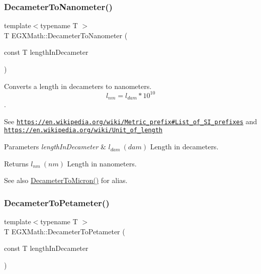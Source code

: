 \subsubsection{\texorpdfstring{Decameter\+To\+Nanometer()}{DecameterToNanometer()}}
{\footnotesize\ttfamily template$<$typename T $>$ \\
T E\+G\+X\+Math\+::\+Decameter\+To\+Nanometer (\begin{DoxyParamCaption}\item[{const T}]{length\+In\+Decameter }\end{DoxyParamCaption})}



Converts a length in decameters to nanometers. \[ l_{nm}=l_{dam} * 10^{10} \]. 

See \href{https://en.wikipedia.org/wiki/Metric_prefix#List_of_SI_prefixes}{\tt https\+://en.\+wikipedia.\+org/wiki/\+Metric\+\_\+prefix\#\+List\+\_\+of\+\_\+\+S\+I\+\_\+prefixes} and \href{https://en.wikipedia.org/wiki/Unit_of_length}{\tt https\+://en.\+wikipedia.\+org/wiki/\+Unit\+\_\+of\+\_\+length} 
\begin{DoxyParams}{Parameters}
{\em length\+In\+Decameter} & $ l_{dam}\ (dam)$ Length in decameters. \\
\hline
\end{DoxyParams}
\begin{DoxyReturn}{Returns}
$ l_{nm}\ (nm)$ Length in nanometers. 
\end{DoxyReturn}
\begin{DoxySeeAlso}{See also}
\mbox{\hyperlink{group___e_g_x_math-_conversions-_length_conversions-_s_i-_decameter-_non-_s_i_gaf3c7befd051b823dc17aca5318cae689}{Decameter\+To\+Micron()}} for alias. 
\end{DoxySeeAlso}
\mbox{\label{group___e_g_x_math-_conversions-_length_conversions-_s_i-_decameter-_s_i_ga0475fbe33c57dc772e3121f776d82fd0}} 
\subsubsection{\texorpdfstring{Decameter\+To\+Petameter()}{DecameterToPetameter()}}
{\footnotesize\ttfamily template$<$typename T $>$ \\
T E\+G\+X\+Math\+::\+Decameter\+To\+Petameter (\begin{DoxyParamCaption}\item[{const T}]{length\+In\+Decameter }\end{DoxyParamCaption})}



